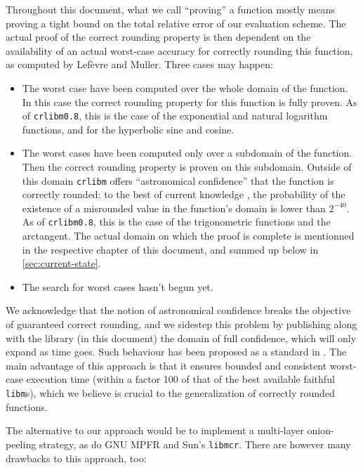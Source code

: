Throughout this document, what we call ``proving'' a function mostly
means proving a tight bound on the total relative error of our
evaluation scheme. The actual proof of the correct rounding property
is then dependent on the availability of an actual worst-case accuracy
for correctly rounding this function, as computed by Lef\`evre and
Muller. Three cases may happen:
\begin{itemize}
\item The worst case have been computed over the whole domain of the
  function. In this case the correct rounding property for this
  function is fully proven. As of \texttt{crlibm0.8}, this is the case
  of the exponential and natural logarithm functions, and for the
  hyperbolic sine and cosine.

\item The worst cases have been computed only over a subdomain of the
  function. Then the correct rounding property is proven on this
  subdomain. Outside of this domain \texttt{crlibm} offers
  ``astronomical confidence'' that the function is correctly rounded:
  to the best of current knowledge \cite{Gal86, DinGast2005}, the
  probability of the existence of a misrounded value in the function's
  domain is lower than $2^{-40}$. As of \texttt{crlibm0.8}, this is
  the case of the trigonometric functions and the arctangent. The
  actual domain on which the proof is complete is mentionned in the
  respective chapter of this document, and summed up below in \ref{sec:current-state}.
\item The search for worst cases hasn't begun yet.
\end{itemize}

We acknowledge that the notion of astronomical confidence breaks the
objective of guaranteed correct rounding, and we sidestep this problem
by publishing along with the library (in this document) the domain of
full confidence, which will only expand as time goes.  Such behaviour
has been proposed as a standard in \cite{DefHanLefMulRevZim2004}.  The
main advantage of this approach is that it ensures bounded and
consistent worst-case execution time (within a factor 100 of that of
the best available faithful \texttt{libm}s), which we believe is
crucial to the generalization of correctly rounded functions.

The alternative to our approach would be to implement a
multi-layer onion-peeling strategy, as do GNU MPFR and Sun's
\texttt{libmcr}. There are however many drawbacks to this approach, too:

